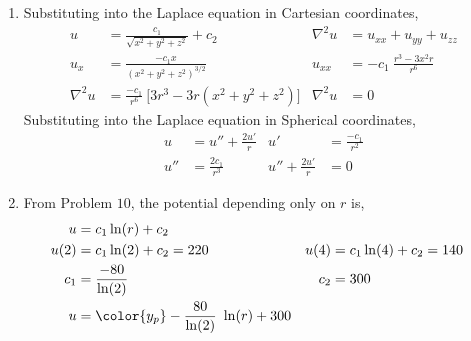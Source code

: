 \begin{enumerate}
    \item Substituting into the Laplace equation in Cartesian coordinates,
          \begin{align}
              u          & = \frac{c_1}{\sqrt{x^2 + y^2 + z^2}} + c_2                &
              \nabla^2 u & = u_{xx} + u_{yy} + u_{zz}                                  \\
              u_{x}      & = \frac{-c_1x}{(x^2 + y^2 + z^2)^{3/2}}                   &
              u_{xx}     & = -c_1\ \frac{r^3 - 3x^2r}{r^6}                             \\
              \nabla^2 u & =\frac{-c_1}{r^6}\ \Big[ 3r^3 - 3r(x^2 + y^2 + z^2) \Big] &
              \nabla^2 u & = 0
          \end{align}
          Substituting into the Laplace equation in Spherical coordinates,
          \begin{align}
              u                   & = u'' + \frac{2u'}{r} &
              u'                  & = \frac{-c_1}{r^2}      \\
              u''                 & = \frac{2c_1}{r^3}    &
              u'' + \frac{2u'}{r} & = 0
          \end{align}

    \item From Problem $ 10 $, the potential depending only on $ r $ is,
          \begin{align}
              u    & = c_1 \ln(r) + c_2                               \\
              u(2) & = c_1\ln(2) + c_2 = 220                        &
              u(4) & = c_1\ln(4) + c_2 = 140                          \\
              c_1  & = \frac{-80}{\ln(2)}                           &
              c_2  & = 300                                            \\
              u    & = \color{y_p} -\frac{80}{\ln(2)}\ \ln(r) + 300
          \end{align}


\end{enumerate}

